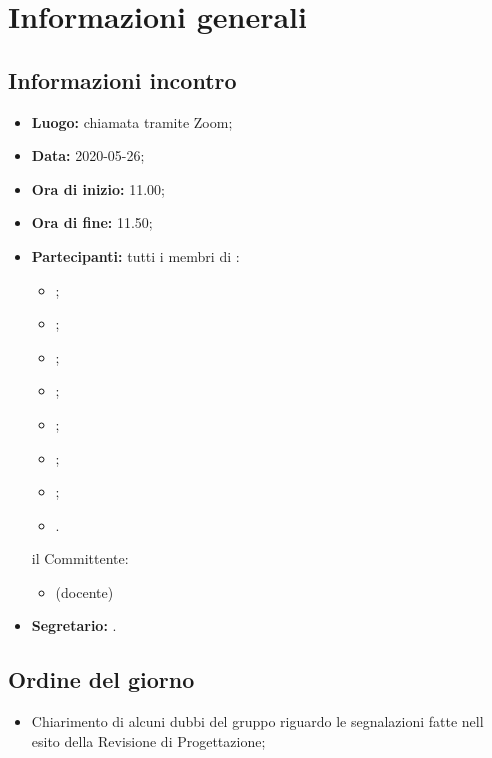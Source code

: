 \section{Informazioni generali}
\subsection{Informazioni incontro}
\begin{itemize}
	\item \textbf{Luogo:} chiamata tramite Zoom;
	\item \textbf{Data:} 2020-05-26;
	\item \textbf{Ora di inizio:} 11.00;
	\item \textbf{Ora di fine:} 11.50;
	\item \textbf{Partecipanti:}
		tutti i membri di \Gruppo:
		\begin{itemize}
			\item \VB;
			\item \LB;
			\item \NF;
			\item \EG;
			\item \FJ;
			\item \MP;
			\item \AS;
			\item \AZ.
		\end{itemize}
		il Committente:
		\begin{itemize}
			\item \TV{} (docente)
		\end{itemize}
	\item \textbf{Segretario:} \MP.
\end{itemize}

\subsection{Ordine del giorno}
\begin{itemize}
	\item Chiarimento di alcuni dubbi del gruppo riguardo le segnalazioni fatte nell esito della Revisione di Progettazione;
\end{itemize}
